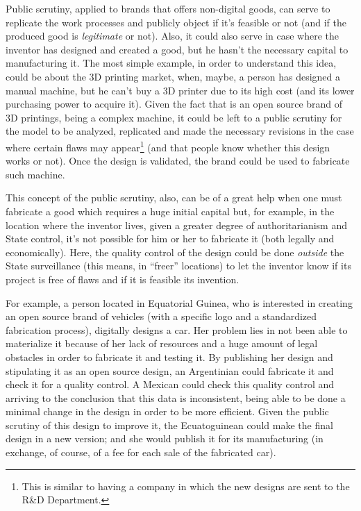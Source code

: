 \documentclass[12pt,a4paper]{article}
\begin{document}
Public scrutiny, applied to brands that offers non-digital goods, can serve to replicate the work processes and publicly object if it's feasible or not (and if the produced good is \textit{legitimate} or not). Also, it could also serve in case where the inventor has designed and created a good, but he hasn't the necessary capital to manufacturing it. The most simple example, in order to understand this idea, could be about the 3D printing market, when, maybe, a person has designed a manual machine, but he can't buy a 3D printer due to its high cost (and its lower purchasing power to acquire it). Given the fact that is an open source brand of 3D printings, being a complex machine, it could be left to a public scrutiny for the model to be analyzed, replicated and made the necessary revisions in the case where certain flaws may appear\footnote{This is similar to having a company in which the new designs are sent to the R\&D Department.} (and that people know whether this design works or not). Once the design is validated, the brand could be used to fabricate such machine.

This concept of the public scrutiny, also, can be of a great help when one must fabricate a good which requires a huge initial capital but, for example, in the location where the inventor lives, given a greater degree of authoritarianism and State control, it's not possible for him or her to fabricate it (both legally and economically). Here, the quality control of the design could be done \textit{outside} the State surveillance (this means, in “freer” locations) to let the inventor know if its project is free of flaws and if it is feasible its invention.

For example, a person located in Equatorial Guinea, who is interested in creating an open source brand of vehicles (with a specific logo and a standardized fabrication process), digitally designs a car. Her problem lies in not been able to materialize it because of her lack of resources and a huge amount of legal obstacles in order to fabricate it and testing it. By publishing her design and stipulating it as an open source design, an Argentinian could fabricate it and check it for a quality control. A Mexican could check this quality control and arriving to the conclusion that this data is inconsistent, being able to be done a minimal change in the design in order to be more efficient. Given the public scrutiny of this design to improve it, the Ecuatoguinean could make the final design in a new version; and she would publish it for its manufacturing (in exchange, of course, of a fee for each sale of the fabricated car).
\end{document}
